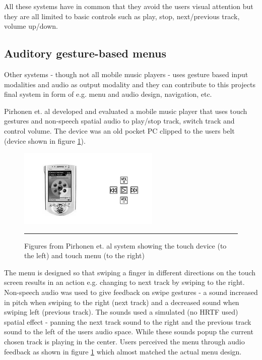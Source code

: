 All these systems have in common that they avoid the users visual attention but they are all limited to basic controls such as play, stop, next/previous track, volume up/down.

\subsection{Auditory gesture-based menus}
Other systems - though not all mobile music players - uses gesture based input modalities and audio as output modality and they can contribute to this projects final system in form of e.g. menu and audio design, navigation, etc.

Pirhonen et. al \cite{pirhonen_gestural_2002} developed and evaluated a mobile music player that uses touch gestures and non-speech spatial audio to play/stop track, switch track and control volume. The device was an old pocket PC clipped to the users belt (device shown in figure \ref{fig:pirhonen}).

\begin{figure}[t]
	\centering
		\includegraphics[width=0.6\textwidth,height=\textheight,keepaspectratio]{./Figures/pirhonen-system.png}
		\rule{35em}{0.5pt}
	\caption[Pirhonen system]{Figures from Pirhonen et. al \cite{pirhonen_gestural_2002} system showing the touch device (to the left) and touch menu (to the right)}
	\label{fig:pirhonen}
\end{figure}

The menu is designed so that swiping a finger in different directions on the touch screen results in an action e.g. changing to next track by swiping to the right. Non-speech audio was used to give feedback on swipe gestures - a sound increased in pitch when swiping to the right (next track) and a decreased sound when swiping left (previous track). The sounds used a simulated (no HRTF used) spatial effect - panning the next track sound to the right and the previous track sound to the left of the users audio space. While these sounds popup the current chosen track is playing in the center. Users perceived the menu through audio feedback as shown in figure \ref{fig:pirhonen} which almost matched the actual menu design.

